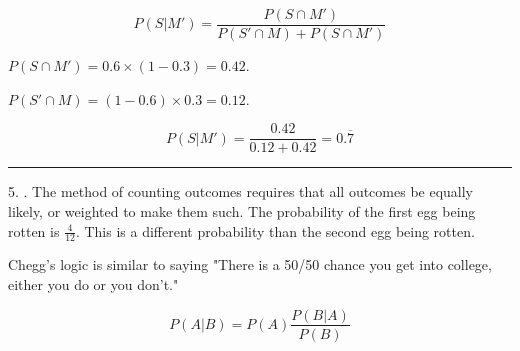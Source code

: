 \documentclass{article}
\begin{document}
\begin{equation}
\label{eq:bayes}
P(S|M') = \frac{P(S\cap M')}{P(S' \cap M) + P(S\cap M')}
\end{equation}

$P(S\cap M') = 0.6 \times (1-0.3) = 0.42$. 

$P(S' \cap M) = (1 - 0.6) \times 0.3 = 0.12$. 

\[P(S|M') = \frac{0.42}{0.12 + 0.42} = \boxed{0.\overline{7}}\]





\noindent\rule{8cm}{0.4pt}



5. . The method of counting outcomes requires that all outcomes be equally likely, or weighted to make them such. The probability of the first egg being rotten is $\frac{4}{12}$. This is a different probability than the second egg being rotten. 

Chegg's logic is similar to saying "There is a 50/50 chance you get into college, either you do or you don't." 



\begin{equation}
\label{eq:bayes}
P(A|B) = P(A) \frac{P(B|A)}{P(B)}
\end{equation}






















 
\end{document}
